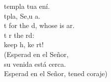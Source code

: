 \begin{cancion}%
	templa tua ení. \\
	tpla, Se,u a. \\
\jump
	t for the d, whose is ar. \\
	t r the rd: \\
	keep h, ke rt!\\
(Esperad en el Señor, \\
 su venida está cerca. \\
 Esperad en el Señor, tened coraje)\\
\end{cancion}%
